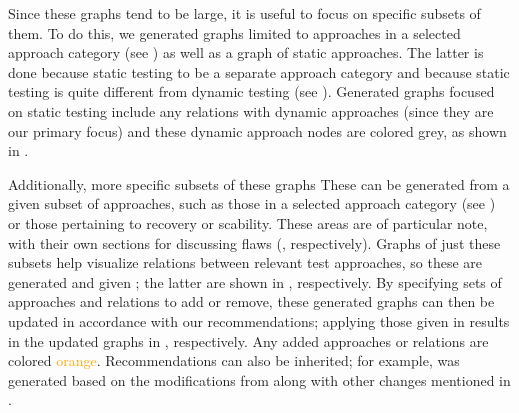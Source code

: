 \fi
Since these graphs tend to be large, it is useful to focus on specific
subsets of them. \ifnotpaper To do this, we generated graphs limited to
    approaches in a selected approach category (see )
    as well as a graph of static approaches. The latter is done because
    \citet[Fig.~2]{IEEE2022}  static testing to be a
    separate approach category and because static testing is quite different
    from dynamic testing (see ). Generated graphs focused
    on static testing include any relations with dynamic approaches (since
    they are our primary focus) and these dynamic approach nodes are
    colored grey, as shown in .

    Additionally, more specific subsets of these graphs \else These \fi
can be generated from a given subset of approaches, such as
\ifnotpaper\else those in a selected approach category (see
    ) or \fi those pertaining to recovery or
scability\ifnotpaper. These areas are of particular note, with their own
sections for discussing flaws (,
respectively). Graphs of just these subsets help visualize relations
between relevant test approaches, so these are generated and given
\else; the latter are shown \fi in , respectively. By specifying sets of approaches
and relations to add or remove,
these generated graphs can then be updated in accordance with our
recommendations; applying those given in  results in the updated graphs in
, respectively. Any added approaches or relations are
colored \textcolor{orange}{orange}.
\ifnotpaper
    Recommendations can also be inherited; for example,
     was generated based on the modifications from
     along with
    other changes mentioned in .
\fi

\ifnotpaper
    
\else
    \sntxFlawsTable{}
    \smntcFlawsTable{}
\fi
